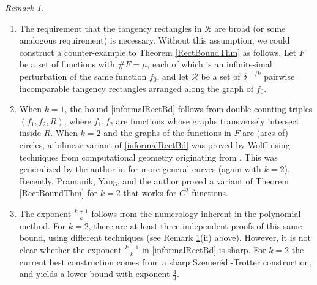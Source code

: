 \documentclass[letterpaper, reqno,11pt]{article}
\numberwithin{equation}{section}
\numberwithin{thm}{section}
\theoremstyle{remark}
\newtheorem{rem}[thm]{Remark}
\begin{document}
\begin{rem}\label{RectBoundThmInformalRemarks}
$\phantom{1}$
\smallskip
\begin{enumerate}

\item[(i)] The requirement that the tangency rectangles in $\mathcal{R}$ are broad (or some analogous requirement) is necessary. Without this assumption, we could construct a counter-example to Theorem \ref{RectBoundThm} as follows. Let $F$ be a set of functions with $\#F = \mu$, each of which is an infinitesimal perturbation of the same function $f_0$, and let $\mathcal{R}$ be a set of $\delta^{-1/k}$ pairwise incomparable tangency rectangles arranged along the graph of $f_0$. 

\item[(ii)] When $k=1$, the bound \eqref{informalRectBd} follows from double-counting triples $(f_1, f_2, R)$, where $f_1,f_2$ are functions whose graphs transversely intersect inside $R$. When $k=2$ and the graphs of the functions in $F$ are (arcs of) circles, a bilinear variant of \eqref{informalRectBd} was proved by Wolff \cite{Wolff2000} using techniques from computational geometry originating from \cite{CEGSW}. This was generalized by the author in \cite{Zahl2012} for more general curves (again with $k=2$). Recently, Pramanik, Yang, and the author \cite{PYZ} proved a variant of Theorem \ref{RectBoundThm} for $k=2$ that works for $C^2$ functions.

\item[(iii)] The exponent $\frac{k+1}{k}$ follows from the numerology inherent in the polynomial method. For $k=2$, there are at least three independent proofs of this same bound, using different techniques (see Remark \ref{RectBoundThmInformalRemarks}(ii) above). However, it is not clear whether the exponent $\frac{k+1}{k}$ in \eqref{informalRectBd} is sharp. For $k=2$ the current best construction comes from a sharp Szemer\'edi-Trotter construction, and yields a lower bound with exponent $\frac{4}{3}$. 

\end{enumerate}
\end{rem}

\end{document}
